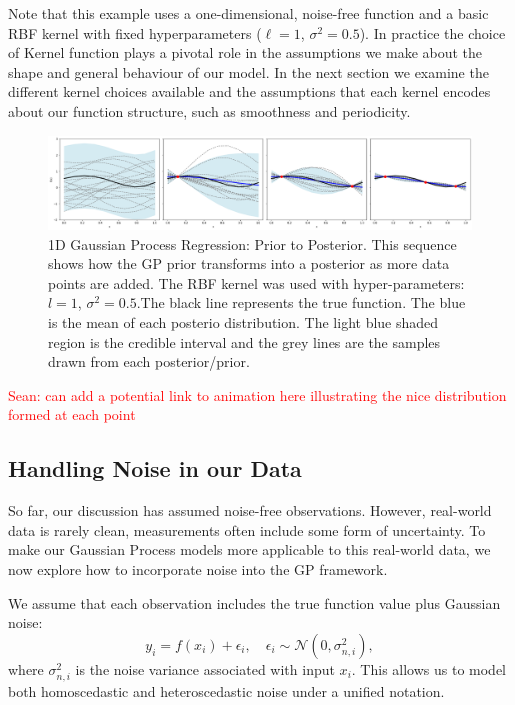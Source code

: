 \documentclass[11pt]{article}
\newcommand{\Sean}[1]{{\textcolor{red}{{Sean: #1}} }}
\begin{document}
\noindent
Note that this example uses a one-dimensional, noise-free function and a basic RBF kernel with fixed hyperparameters (\(\ell = 1\), \(\sigma^2 = 0.5\)). 
In practice the choice of Kernel function plays a pivotal role in the assumptions we make about the shape and general behaviour of our model. In the next section
we examine the different kernel choices available and the assumptions that each kernel encodes about our function structure, such as smoothness and periodicity.



\begin{figure}[H]
    \centering
        \includegraphics[width=\textwidth]{LatexPlots/1dplots/priortoposterior.png}
    \caption{1D Gaussian Process Regression: Prior to Posterior. This sequence shows how the GP prior transforms into a posterior as more data points are added. 
    The RBF kernel was used with hyper-parameters: $l = 1$, $\sigma^2 = 0.5$.The black line represents the true function. The blue is the mean of each posterio distribution. 
    The light blue shaded region is the credible interval and the grey lines are the samples drawn from each posterior/prior. }
    \label{fig: priortoposterior}
\end{figure}
\Sean{can add a potential link to animation here illustrating the nice distribution formed at each point}




\subsection{Handling Noise in our Data}
\label{sec: Handlingnoise}

So far, our discussion has assumed noise-free observations. However, real-world data is rarely clean, measurements often include some form of uncertainty. To make our Gaussian Process models more applicable to this real-world data,
we now explore how to incorporate noise into the GP framework.

\bigskip

\noindent
We assume that each observation includes the true function value plus Gaussian noise:
\begin{equation}
y_i = f(x_i) + \epsilon_i, \quad \epsilon_i \sim \mathcal{N}(0, \sigma_{n,i}^2),
\end{equation}
where \( \sigma_{n,i}^2 \) is the noise variance associated with input \( x_i \). This allows us to model both homoscedastic and heteroscedastic noise under a unified notation.
\end{document}
